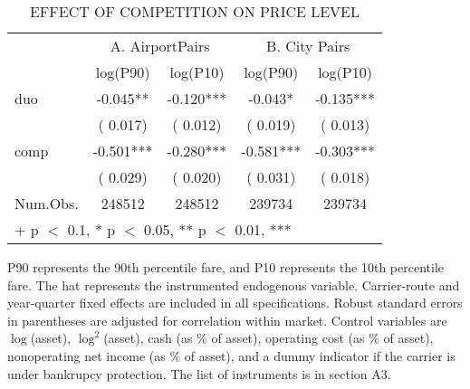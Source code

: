 \begin{table}\centering
	\caption{EFFECT OF COMPETITION ON PRICE LEVEL}
	\centering
	\begin{threeparttable}
			\begin{tabular}[t]{lcccc}\toprule\multicolumn{1}{c}{} & \multicolumn{2}{c}{A. AirportPairs} & \multicolumn{2}{c}{B. City Pairs} \\\cmidrule(l{3pt}r{3pt}){2-3} \cmidrule(l{3pt}r{3pt}){4-5}  & log(P90) & log(P10) & log(P90)  & log(P10) \\\midrule
				duo &  {-0.045}** &  {-0.120}*** &  {-0.043}* &  {-0.135}***\\ & ( {0.017}) & ( {0.012}) & ( {0.019}) & ( {0.013})\\
				comp &  {-0.501}*** &  {-0.280}*** &  {-0.581}*** &  {-0.303}***\\ & ( {0.029}) & ( {0.020}) & ( {0.031}) & ( {0.018})\\\midrule
				Num.Obs. &  {248512} &  {248512} &  {239734} &  {239734}\\\bottomrule\multicolumn{5}{l}{\rule{0pt}{1em}+ p $<$ 0.1, * p $<$ 0.05, ** p $<$ 0.01, *** }\\
				\end{tabular} \small
				\begin{tablenotes} 
					\item P90 represents the 90th percentile fare, and P10 represents the 10th percentile fare. The hat represents the instrumented endogenous variable. Carrier-route and year-quarter fixed effects are included in all specifications. Robust standard errors in parentheses are adjusted for correlation within market. Control variables are $\log$(asset), $\log^{2}$(asset), cash (as \% of asset), operating cost (as \% of asset), nonoperating net income (as \% of asset), and a dummy indicator if the carrier is under bankrupcy protection. The list of instruments is in section A3.
				\end{tablenotes}
	\end{threeparttable}
\end{table}